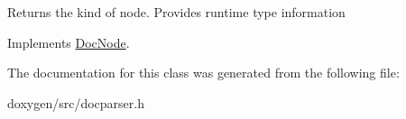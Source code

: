 Returns the kind of node. Provides runtime type information 

Implements \mbox{\hyperlink{class_doc_node_a108ffd214a72ba6e93dac084a8f58049}{Doc\+Node}}.



The documentation for this class was generated from the following file\+:\begin{DoxyCompactItemize}
\item 
doxygen/src/docparser.\+h\end{DoxyCompactItemize}
